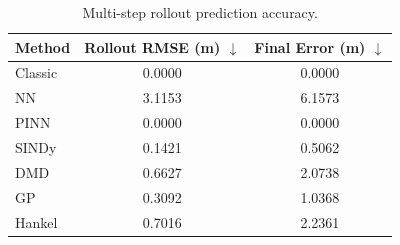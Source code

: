 \begin{table}[htbp]
\centering
\caption{Multi-step rollout prediction accuracy.}
\label{tab:rollout}
\begin{tabular}{lcc}
\toprule
Method & Rollout RMSE (m) $\downarrow$ & Final Error (m) $\downarrow$ \\
\midrule
Classic & 0.0000 & 0.0000 \\
NN & 3.1153 & 6.1573 \\
PINN & 0.0000 & 0.0000 \\
SINDy & 0.1421 & 0.5062 \\
DMD & 0.6627 & 2.0738 \\
GP & 0.3092 & 1.0368 \\
Hankel & 0.7016 & 2.2361 \\
\bottomrule
\end{tabular}
\end{table}